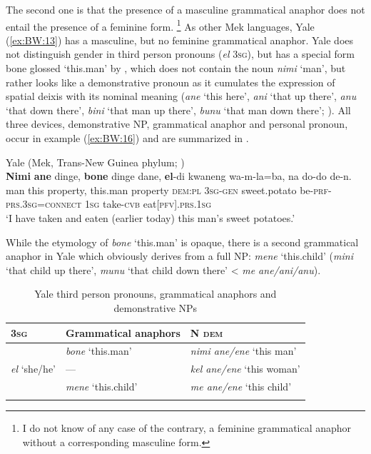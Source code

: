 \documentclass[output=collectionpaper]{langsci/langscibook}
\begin{document}
The second one is that the presence of a masculine grammatical anaphor does not entail the presence of a feminine form.%
\footnote{%
I do not know of any case of the contrary, a feminine grammatical anaphor without a corresponding masculine form.
} %
As other Mek languages, Yale (\ref{ex:BW:13}) has a masculine, but no feminine grammatical anaphor. Yale does not distinguish gender in third person pronouns (\textit{el} \textsc{3sg}), but has a special form bone glossed ‘this.man’ by \citet{Heeschen1992}, which does not contain the noun \textit{nimi} ‘man’, but rather looks like a demonstrative pronoun as it cumulates the expression of spatial deixis with its nominal meaning (\textit{ane} ‘this here’, \textit{ani} ‘that up there’, \textit{anu} ‘that down there’, \textit{bini} ‘that man up there’, \textit{bunu} ‘that man down there’; \citealt[15]{Heeschen1992}). All three devices, demonstrative NP, grammatical anaphor and personal pronoun, occur in example (\ref{ex:BW:16}) and are summarized in .

\ea\label{ex:BW:16}
Yale (Mek, Trans-New Guinea phylum; \citealt[29]{Heeschen1992})\\
\gll \textbf{Nimi}	\textbf{ane}	dinge,	\textbf{bone}	dinge	dane,	\textbf{el}-di	kwaneng	wa-m-la=ba, na	do-do	de-n.\\
man	this	property,	this.man	property	\textsc{dem:pl}	\textsc{3sg-gen}	sweet.potato	be-\textsc{prf-prs.3sg}=\textsc{connect} \textsc{1sg}	take-\textsc{cvb}	eat\textsc{[pfv].prs.1sg}\\
\glt ‘I have taken and eaten (earlier today) this man’s sweet potatoes.’\\
\z

While the etymology of \textit{bone} ‘this.man’ is opaque, there is a second grammatical anaphor in Yale which obviously derives from a full NP: \textit{mene} ‘this.child’ (\textit{mini} ‘that child up there’, \textit{munu} ‘that child down there’ < \textit{me ane/ani/anu}).

\begin{table}
\begin{tabularx}{\textwidth}{lQQ}
\lsptoprule
\scshape 3sg	&	Grammatical anaphors	&	N \scshape dem	\\
\midrule
	&	\textit{bone} ‘this.man’	&	\textit{nimi ane/ene} ‘this man’	\\
\textit{el} ‘she/he’	&	—	&	\textit{kel ane/ene} ‘this woman’	\\
	&	\textit{mene} ‘this.child’	&	\textit{me ane/ene} ‘this child’	\\
\lspbottomrule
\end{tabularx}
\caption{Yale third person pronouns, grammatical anaphors and demonstrative NPs}
\label{tab:BW:7}
\end{table}
\end{document}
